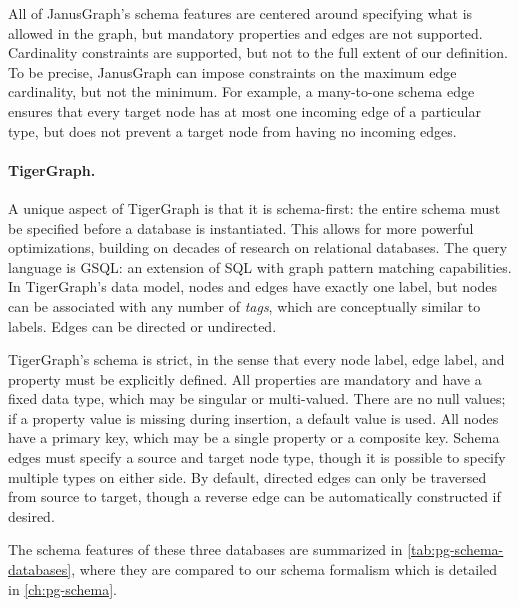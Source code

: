 \documentclass{report}
\theoremstyle{definition}
\begin{document}
All of JanusGraph's schema features are centered around specifying what is allowed in the graph, but mandatory properties and edges are not supported. Cardinality constraints are supported, but not to the full extent of our definition. To be precise, JanusGraph can impose constraints on the maximum edge cardinality, but not the minimum. For example, a many-to-one schema edge ensures that every target node has at most one incoming edge of a particular type, but does not prevent a target node from having no incoming edges.

\paragraph{TigerGraph.} A unique aspect of TigerGraph \citep{deutsch2019tigergraph} is that it is schema-first: the entire schema must be specified before a database is instantiated. This allows for more powerful optimizations, building on decades of research on relational databases. The query language is GSQL: an extension of SQL with graph pattern matching capabilities. In TigerGraph's data model, nodes and edges have exactly one label, but nodes can be associated with any number of \emph{tags}, which are conceptually similar to labels. Edges can be directed or undirected.

TigerGraph's schema is strict, in the sense that every node label, edge label, and property must be explicitly defined. All properties are mandatory and have a fixed data type, which may be singular or multi-valued. There are no null values; if a property value is missing during insertion, a default value is used. All nodes have a primary key, which may be a single property or a composite key. Schema edges must specify a source and target node type, though it is possible to specify multiple types on either side. By default, directed edges can only be traversed from source to target, though a reverse edge can be automatically constructed if desired.

The schema features of these three databases are summarized in \autoref{tab:pg-schema-databases}, where they are compared to our schema formalism which is detailed in \autoref{ch:pg-schema}.
\end{document}
